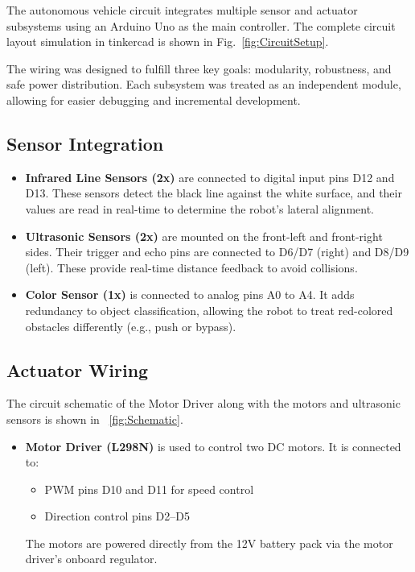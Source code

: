 \documentclass[conference]{IEEEtran}
\begin{document}
The autonomous vehicle circuit integrates multiple sensor and actuator subsystems using an Arduino Uno as the main controller. The complete circuit layout simulation in tinkercad is shown in Fig.~\ref{fig:CircuitSetup}.


The wiring was designed to fulfill three key goals: modularity, robustness, and safe power distribution. Each subsystem was treated as an independent module, allowing for easier debugging and incremental development.

\subsection{Sensor Integration}
\begin{itemize}
  \item \textbf{Infrared Line Sensors (2x)} are connected to digital input pins D12 and D13. These sensors detect the black line against the white surface, and their values are read in real-time to determine the robot's lateral alignment.

  \item \textbf{Ultrasonic Sensors (2x)} are mounted on the front-left and front-right sides. Their trigger and echo pins are connected to D6/D7 (right) and D8/D9 (left). These provide real-time distance feedback to avoid collisions.

  \item \textbf{Color Sensor (1x)} is connected to analog pins A0 to A4. It adds redundancy to object classification, allowing the robot to treat red-colored obstacles differently (e.g., push or bypass).
\end{itemize}

\subsection{Actuator Wiring}
The circuit schematic of the Motor Driver along with the motors and ultrasonic sensors is shown in ~\ref{fig:Schematic}.
\begin{itemize}
  \item \textbf{Motor Driver (L298N)} is used to control two DC motors. It is connected to:
  \begin{itemize}
    \item PWM pins D10 and D11 for speed control
    \item Direction control pins D2–D5
  \end{itemize}
  The motors are powered directly from the 12V battery pack via the motor driver's onboard regulator.
\end{itemize}
\end{document}
